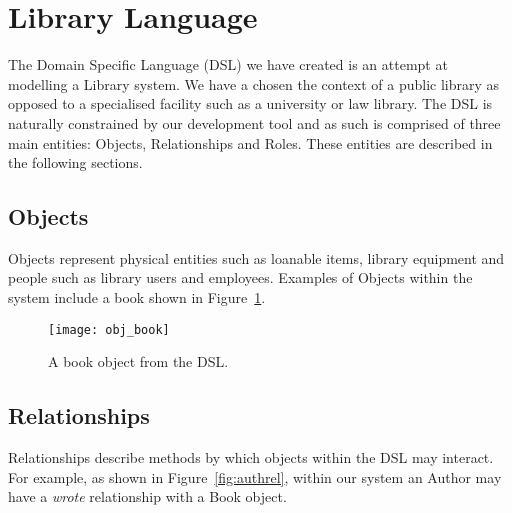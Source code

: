 \section{Library Language}
The Domain Specific Language (DSL) we have created is an attempt at modelling a Library system. We have a chosen the context of a public library as opposed to a specialised facility such as a university or law library. The DSL is naturally constrained by our development tool and as such  is comprised of three main entities: Objects, Relationships and Roles. These entities are described in the following sections. 

\subsection{Objects}
Objects represent physical entities such as loanable items, library equipment and people such as library users and employees. Examples of Objects within the system include a book shown in Figure~\ref{fig:objbook}.

\begin{figure}[H]
  \centering
  \texttt{[image: obj\_book]}  
  \caption{A book object from the DSL.}
  \label{fig:objbook}
\end{figure}










\subsection{Relationships}
Relationships describe methods by which objects within the DSL may interact. For example, as shown in Figure~\ref{fig:authrel}, within our system an Author may have a \emph{wrote} relationship with a Book object.

